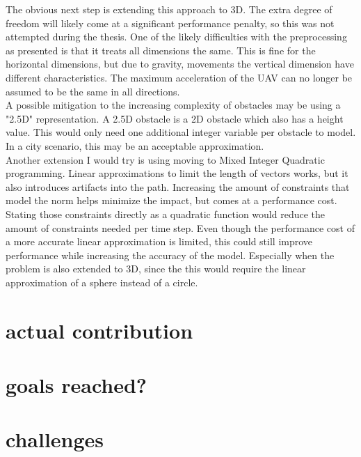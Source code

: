 The obvious next step is extending this approach to 3D. The extra degree of freedom will likely come at a significant performance penalty, so this was not attempted during the thesis. One of the likely difficulties with the preprocessing as presented is that it treats all dimensions the same. This is fine for the horizontal dimensions, but due to gravity, movements the vertical dimension have different characteristics. The maximum acceleration of the UAV can no longer be assumed to be the same in all directions.\\
A possible mitigation to the increasing complexity of obstacles may be using a "2.5D" representation. A 2.5D obstacle is a 2D obstacle which also has a height value. This would only need one additional integer variable per obstacle to model. In a city scenario, this may be an acceptable approximation. \\

Another extension I would try is using moving to Mixed Integer Quadratic programming. Linear approximations to limit the length of vectors works, but it also introduces artifacts into the path. Increasing the amount of constraints that model the norm helps minimize the impact, but comes at a performance cost. Stating those constraints directly as a quadratic function would reduce the amount of constraints needed per time step. Even though the performance cost of a more accurate linear approximation is limited, this could still improve performance while increasing the accuracy of the model. Especially when the problem is also extended to 3D, since the this would require the linear approximation of a sphere instead of a circle. \\

\section{actual contribution}
\section{goals reached?}


\section{challenges}